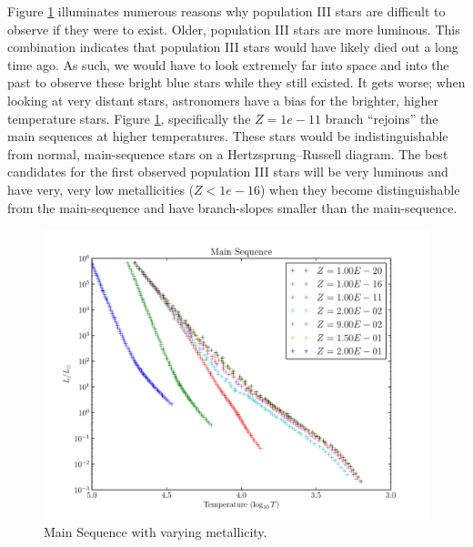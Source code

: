\documentclass[11pt]{article}
\begin{document}
    Figure \ref{fig:ms} illuminates numerous reasons why population III stars are difficult to observe if they were to exist. Older, population III stars are more luminous. This combination indicates that population III stars would have likely died out a long time ago. As such, we would have to look extremely far into space and into the past to observe these bright blue stars while they still existed. It gets worse; when looking at very distant stars, astronomers have a bias for the brighter, higher temperature stars. Figure \ref{fig:ms}, specifically the $Z = 1e-11$ branch ``rejoins'' the main sequences at higher temperatures. These stars would be indistinguishable from normal, main-sequence stars on a Hertzsprung–Russell diagram. The best candidates for the first observed population III stars will be very luminous and have very, very low metallicities ($Z<1e-16$) when they become distinguishable from the main-sequence and have branch-slopes smaller than the main-sequence.
    \begin{center}
        \begin{figure}[H]
            \includegraphics[width=\textwidth]{figures/ms.pdf}
            \caption{Main Sequence with varying metallicity.}
            \label{fig:ms}
        \end{figure}
    \end{center}
\end{document}
